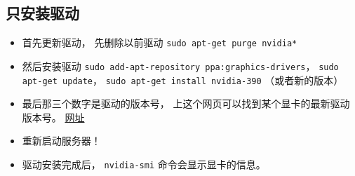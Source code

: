 \subsection{只安装驱动}
\begin{itemize}
\item 首先更新驱动， 先删除以前驱动 \verb`sudo apt-get purge nvidia*`
\item 然后安装驱动 \verb`sudo add-apt-repository ppa:graphics-drivers`， \verb`sudo apt-get update`， \verb`sudo apt-get install nvidia-390` （或者新的版本）
\item 最后那三个数字是驱动的版本号， 上这个网页可以找到某个显卡的最新驱动版本号。 \href{http://www.nvidia.com/Download/index.aspx?lang=en-us}{网址}
\item 重新启动服务器！
\item 驱动安装完成后， \verb`nvidia-smi` 命令会显示显卡的信息。
\end{itemize}
